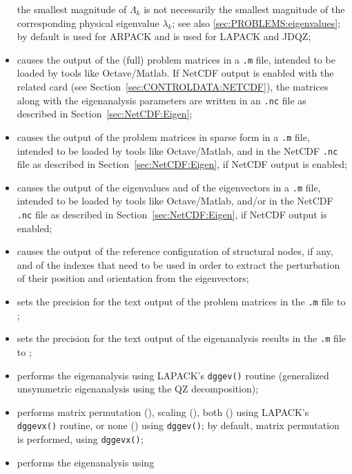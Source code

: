 \begin{itemize}
        the smallest magnitude of $\Lambda_k$ is not necessarily the smallest magnitude
        of the corresponding physical eigenvalue $\lambda_k$; see also \ref{sec:PROBLEMS:eigenvalues};
        by default  is used for ARPACK and  is
        used for LAPACK and JDQZ;
\item {} causes the output
	of the (full) problem matrices in a \texttt{.m} file,
	intended to be loaded by tools like Octave/Matlab. If
	NetCDF output is enabled with the related 
	card (see Section~\ref{sec:CONTROLDATA:NETCDF}), 
	the matrices along with the eigenanalysis parameters 
	are written in an \texttt{.nc} file as described in 
	Section~\ref{sec:NetCDF:Eigen};
\item {} causes the output
	of the problem matrices in sparse form in a \texttt{.m} file,
	intended to be loaded by tools like Octave/Matlab, and in the
	NetCDF \texttt{.nc} file as described in 
	Section~\ref{sec:NetCDF:Eigen}, if NetCDF output is enabled;
\item {} causes the output of the eigenvalues
	and of the eigenvectors in a \texttt{.m} file,
	intended to be loaded by tools like Octave/Matlab, and/or in the
	NetCDF \texttt{.nc} file as described in 
	Section~\ref{sec:NetCDF:Eigen}, if NetCDF output is enabled;
\item {} causes the output of the reference
	configuration of structural nodes, if any,
	and of the indexes that need to be used in order to extract
	the perturbation of their position and orientation
	from the eigenvectors;
\item {} sets the precision for the text output
  	of the problem matrices in the \texttt{.m} file to 
        ;
\item {} sets the precision for the text output
  	of the eigenanalysis results in the \texttt{.m} file to
	;
\item {} performs the eigenanalysis using
	LAPACK's \texttt{dggev()} routine (generalized unsymmetric eigenanalysis
	using the QZ decomposition);
\item {} performs matrix permutation (),
	scaling (), both () using LAPACK's
	\texttt{dggevx()} routine, or none () using \texttt{dggev()};
	by default, matrix permutation is performed, using \texttt{dggevx()};
\item {} performs the eigenanalysis using

\end{itemize}
